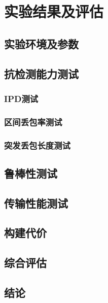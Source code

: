 \section{实验结果及评估}
\label{chap:hash:result}

\subsection{实验环境及参数}
\label{chap:hash:result:parameters}

\subsection{抗检测能力测试}
\label{chap:hash:result:undetectability}

\subsubsection{IPD测试}
\label{chap:hash:result:undetectability:ipd}

\subsubsection{区间丢包率测试}
\label{chap:hash:result:undetectability:plr}

\subsubsection{突发丢包长度测试}
\label{chap:hash:result:undetectability:burst}

\subsection{鲁棒性测试}
\label{chap:hash:result:robustness}

\subsection{传输性能测试}
\label{chap:hash:result:throughput}

\subsection{构建代价}
\label{chap:hash:result:cost}

\subsection{综合评估}
\label{chap:hash:result:evaluation}

\subsection{结论}
\label{chap:hash:result:conclusion}